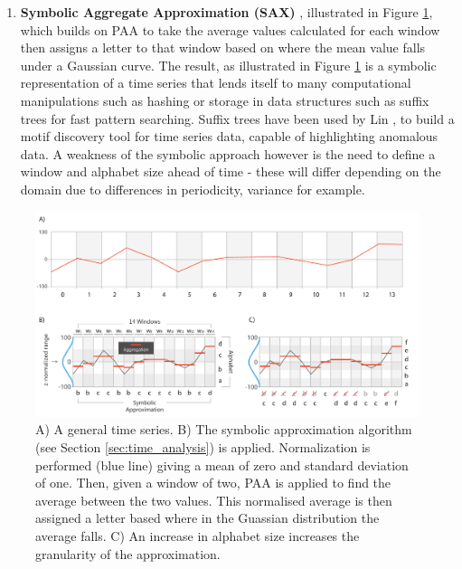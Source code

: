 \begin{enumerate}
\item \textbf{Symbolic Aggregate Approximation (SAX)} \cite{lina2003,linexperiencing2007}, illustrated in Figure \ref{fig:approximation-sax}, which builds on PAA to take the average values calculated for each window then assigns a letter to that window based on where the mean value falls under a Gaussian curve.
The result, as illustrated in Figure \ref{fig:approximation-sax} is a symbolic representation of a time series that lends itself to many computational manipulations such as hashing or storage in data structures such as suffix trees for fast pattern searching.
Suffix trees have been used by Lin \etal \cite{lina2003}, to build a motif discovery tool for time series data, capable of highlighting anomalous data.
A weakness of the symbolic approach however is the need to define a window and alphabet size ahead of time - these will differ depending on the domain due to differences in periodicity, variance for example.

\end{enumerate}

\begin{figure}[b!]
\centering
\includegraphics[width=\textwidth]{images/timeseries/approximation-sax-horizontal}
\caption{A) A general time series.
B) The symbolic approximation algorithm (see Section \ref{sec:time_analysis}) is applied.
Normalization is performed (blue line) giving a mean of zero and standard deviation of one.
Then, given a window of two, PAA is applied to find the average between the two values.
This normalised average is then assigned a letter based where in the Guassian distribution the average falls.
C) An increase in alphabet size increases the granularity of the approximation.}
\label{fig:approximation-sax}
\end{figure}

